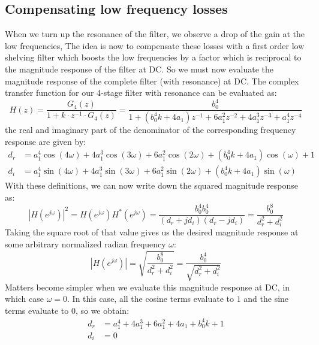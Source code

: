 \subsection{Compensating low frequency losses}
When we turn up the resonance of the filter, we observe a drop of the gain at the low frequencies, The idea is now to compensate these losses with a first order low shelving filter which boosts the low frequencies by a factor which is reciprocal to the magnitude response of the filter at DC. So we must now evaluate the magnitude response of the complete filter (with resonance) at DC. The complex transfer function for our 4-stage filter with resonance can be evaluated as:
\begin{equation}
 H(z) = \frac{G_4(z)} {1 + k \cdot z^{-1} \cdot G_4(z)}
 = \frac{b_0^4}{1 + (b_0^4 k + 4 a_1) z^{-1} + 6 a_1^2 z^{-2} + 4 a_1^3 z^{-3} +  a_1^4 z^{-4} }
\end{equation}
the real and imaginary part of the denominator of the corresponding frequency response are given by:
\begin{equation}
\begin{aligned}
 d_r &= a_1^4 \cos(4 \omega) + 4 a_1^3 \cos(3 \omega) + 6 a_1^2 \cos(2 \omega) + (b_0^4 k + 4 a_1) \cos( \omega) + 1 \\
 d_i &= a_1^4 \sin(4 \omega) + 4 a_1^3 \sin(3 \omega) + 6 a_1^2 \sin(2 \omega) + (b_0^4 k + 4 a_1) \sin( \omega)
\end{aligned}
\end{equation}
With these definitions, we can now write down the squared magnitude response as:
\begin{equation}
 \left|H(e^{j \omega}) \right|^2 = H(e^{j \omega}) H^*(e^{j \omega}) 
 = \frac{b_0^4 b_0^4}{(d_r + j d_i) (d_r - j d_i)} = \frac{b_0^8}{d_r^2 + d_i^2}
\end{equation}
Taking the square root of that value gives us the desired magnitude response at some arbitrary normalized radian frequency $\omega$:
\begin{equation}
 \left|H(e^{j \omega}) \right| = \sqrt{ \frac{b_0^8}{d_r^2 + d_i^2} }
  = \frac{b_0^4} {\sqrt{d_r^2 + d_i^2}} 
\end{equation}
Matters become simpler when we evaluate this magnitude response at DC, in which case $\omega = 0$. In this case, all the cosine terms evaluate to $1$ and the sine terms evaluate to $0$, so we obtain:
\begin{equation}
\begin{aligned}
 d_r &= a_1^4 + 4 a_1^3 + 6 a_1^2 + 4 a_1 + b_0^4 k + 1 \\
 d_i &= 0
\end{aligned}
\end{equation}
